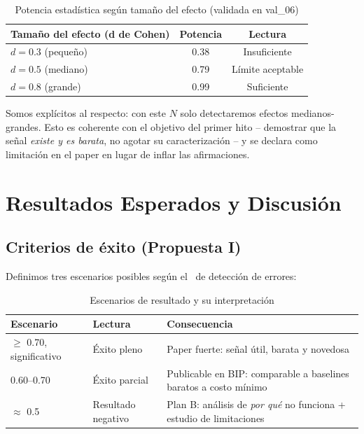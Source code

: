 \documentclass[12pt,a4paper]{article}
\newcommand{\AUROC}{\mathrm{AUROC}}
\begin{document}
\begin{table}[H]
\centering
\caption{Potencia estadística según tamaño del efecto (validada en val\_06)}
\label{tab:potencia}
\begin{tabular}{lcc}
\toprule
\textbf{Tamaño del efecto (d de Cohen)} & \textbf{Potencia} & \textbf{Lectura} \\
\midrule
$d = 0.3$ (pequeño) & 0.38 & Insuficiente \\
$d = 0.5$ (mediano) & 0.79 & Límite aceptable \\
$d = 0.8$ (grande) & 0.99 & Suficiente \\
\bottomrule
\end{tabular}
\end{table}

Somos explícitos al respecto: con este $N$ solo detectaremos efectos medianos-grandes.
Esto es coherente con el objetivo del primer hito -- demostrar que la señal \emph{existe y es barata}, no agotar su caracterización -- y se declara como limitación en el paper en lugar de inflar las afirmaciones.

\section{Resultados Esperados y Discusión}
\label{sec:resultados}

\subsection{Criterios de éxito (Propuesta I)}

Definimos tres escenarios posibles según el \AUROC\ de detección de errores:

\begin{table}[H]
\centering
\caption{Escenarios de resultado y su interpretación}
\label{tab:escenarios}
\begin{tabularx}{\textwidth}{lXX}
\toprule
\textbf{Escenario} & \textbf{Lectura} & \textbf{Consecuencia} \\
\midrule
\AUROC $\geq$ 0.70, significativo & Éxito pleno & Paper fuerte: señal útil, barata y novedosa \\
\AUROC 0.60--0.70 & Éxito parcial & Publicable en BIP: comparable a baselines baratos a costo mínimo \\
\AUROC $\approx$ 0.5 & Resultado negativo & Plan B: análisis de \textit{por qué} no funciona + estudio de limitaciones \\
\bottomrule
\end{tabularx}
\end{table}
\end{document}
